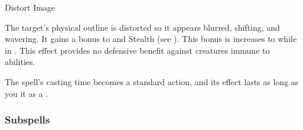 \newpage
\begin{spellsection}{Distort Image}

\begin{spellcontent}

\begin{spelltargetinginfo}



\end{spelltargetinginfo}


\begin{spelleffects}



\spelleffect
The target's physical outline is distorted so it appears blurred, shifting, and wavering.
It gains a  bonus to  and Stealth (see ).
This bonus is increases to  while in .
This effect provides no defensive benefit against creatures immune to  abilities.








\end{spelleffects}

\end{spellcontent}
\begin{spellfooter}


\end{spellfooter}
\begin{spellsubcontent}


\begin{spellcantrip}
The spell's casting time becomes a standard action, and its effect lasts as long as you  it as a .
\end{spellcantrip}


\end{spellsubcontent}
\end{spellsection}


\subsubsection{Subspells}





